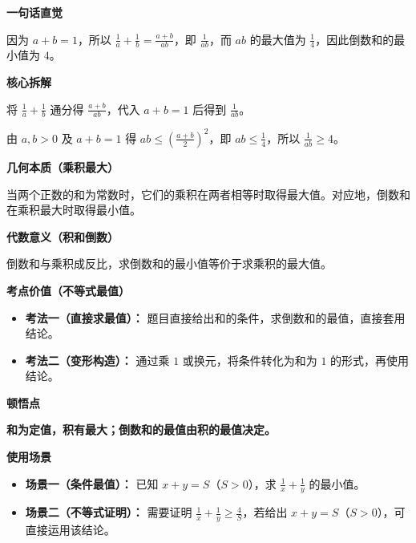 \begin{explanationbox}

	\textbf{\textcolor{CExplanation}{一句话直觉}}

	因为 $a+b=1$，所以 $\frac1a+\frac1b = \frac{a+b}{ab}$，即 $\frac1{ab}$，而 $ab$ 的最大值为 $\frac14$，因此倒数和的最小值为 $4$。

	\medskip
	\textbf{\textcolor{CExplanation}{核心拆解}}
	\begin{description}[style=nextline, leftmargin=2.8em, labelsep=0.5em, itemsep=0.45em]
		\item[\textbf{要点一（代数变形）：}] 将 $\frac1a+\frac1b$ 通分得 $\frac{a+b}{ab}$，代入 $a+b=1$ 后得到 $\frac1{ab}$。
		\item[\textbf{要点二（基本不等式）：}] 由 $a,b>0$ 及 $a+b=1$ 得 $ab\le \left(\frac{a+b}{2}\right)^2$，即 $ab\le\frac14$，所以 $\frac1{ab}\ge4$。
	\end{description}

	\medskip
	\textbf{\textcolor{CExplanation}{几何本质（乘积最大）}}

	当两个正数的和为常数时，它们的乘积在两者相等时取得最大值。对应地，倒数和在乘积最大时取得最小值。

	\medskip
	\textbf{\textcolor{CExplanation}{代数意义（积和倒数）}}

	倒数和与乘积成反比，求倒数和的最小值等价于求乘积的最大值。

	\medskip
	\textbf{\textcolor{CExplanation}{考点价值（不等式最值）}}
	\begin{itemize}[leftmargin=*, itemsep=0.5em, topsep=0.4em]
		\item \textbf{考法一（直接求最值）：} 题目直接给出和的条件，求倒数和的最值，直接套用结论。
		\item \textbf{考法二（变形构造）：} 通过乘 $1$ 或换元，将条件转化为和为 $1$ 的形式，再使用结论。
	\end{itemize}

	\medskip
	\textbf{\textcolor{CExplanation}{顿悟点}}

	\textbf{和为定值，积有最大；倒数和的最值由积的最值决定。}

	\medskip
	\textbf{\textcolor{CExplanation}{使用场景}}
	\begin{itemize}[leftmargin=*, itemsep=0.5em, topsep=0.4em]
		\item \textbf{场景一（条件最值）：} 已知 $x+y = S$（$S>0$），求 $\frac1x+\frac1y$ 的最小值。
		\item \textbf{场景二（不等式证明）：} 需要证明 $\frac1x+\frac1y \ge \frac{4}{S}$，若给出 $x+y=S$（$S>0$），可直接运用该结论。
	\end{itemize}
\end{explanationbox}
